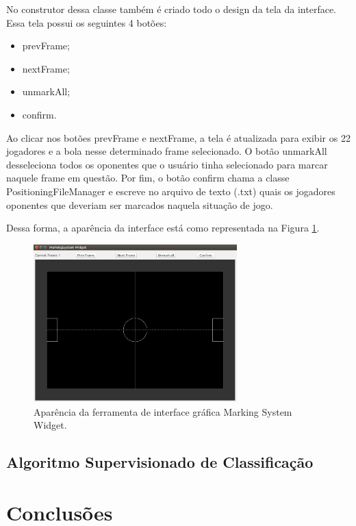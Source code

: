 \documentclass[a4paper,12pt]{article}
\begin{document}
No construtor dessa classe também é criado todo o design da tela da interface. Essa tela possui os seguintes 4 botões:
\begin{itemize}
\item prevFrame;
\item nextFrame;
\item unmarkAll;
\item confirm.
\end{itemize}

Ao clicar nos botões prevFrame e nextFrame, a tela é atualizada para exibir os 22 jogadores e a bola nesse determinado frame selecionado. O botão unmarkAll desseleciona todos os oponentes que o usuário tinha selecionado para marcar naquele frame em questão. Por fim, o botão confirm chama a classe PositioningFileManager e escreve no arquivo de texto (.txt) quais os jogadores oponentes que deveriam ser marcados naquela situação de jogo.

Dessa forma, a aparência da interface está como representada na Figura \ref{fig:ms-widget}.

\begin{figure}[H]
	\centering
	\includegraphics[width=0.7\textwidth]{figures/ms-widget.png}
   \caption{Aparência da ferramenta de interface gráfica Marking System Widget.} \label{fig:ms-widget}
\end{figure}

\subsection{Algoritmo Supervisionado de Classificação}

\section{Conclusões}
\end{document}
